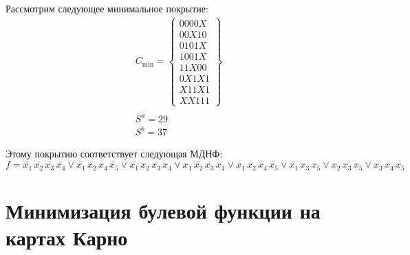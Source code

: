 \documentclass{article}
\begin{document}
Рассмотрим следующее минимальное покрытие:
\[\begin{array}{c}
C_{\text{min}} = \begin{Bmatrix}0000X\\00X10\\0101X\\1001X\\11X00\\0X1X1\\X11X1\\XX111\end{Bmatrix} \\ \\
S^a = 29 \\
S^b = 37
\end{array}\]

Этому покрытию соответствует следующая МДНФ:
\[f = \overline{x_{1}} \, \overline{x_{2}} \, \overline{x_{3}} \, \overline{x_{4}} \lor \overline{x_{1}} \, \overline{x_{2}} \, x_{4} \, \overline{x_{5}} \lor \overline{x_{1}} \, x_{2} \, \overline{x_{3}} \, x_{4} \lor x_{1} \, \overline{x_{2}} \, \overline{x_{3}} \, x_{4} \lor x_{1} \, x_{2} \, \overline{x_{4}} \, \overline{x_{5}} \lor \overline{x_{1}} \, x_{3} \, x_{5} \lor x_{2} \, x_{3} \, x_{5} \lor x_{3} \, x_{4} \, x_{5}\]
\section*{Минимизация булевой функции на картах Карно}
\end{document}
